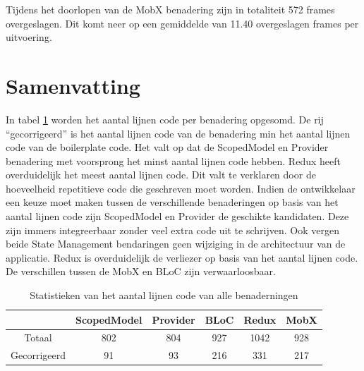 Tijdens het doorlopen van de MobX benadering zijn in totaliteit 572 frames overgeslagen. Dit komt neer op een gemiddelde van 11.40 overgeslagen frames per uitvoering.

\section{Samenvatting}
In tabel \ref{table:amount-lines-of-code} worden het aantal lijnen code per benadering opgesomd. De rij ``gecorrigeerd'' is het aantal lijnen code van de benadering min het aantal lijnen code van de boilerplate code. Het valt op dat de ScopedModel en Provider benadering met voorsprong het minst aantal lijnen code hebben. Redux heeft overduidelijk het meest aantal lijnen code. Dit valt te verklaren door de hoeveelheid repetitieve code die geschreven moet worden. \newline \newline
Indien de ontwikkelaar een keuze moet maken tussen de verschillende benaderingen op basis van het aantal lijnen code zijn ScopedModel en Provider de geschikte kandidaten. Deze zijn immers integreerbaar zonder veel extra code uit te schrijven. Ook vergen beide State Management bendaringen geen wijziging in de architectuur van de applicatie. \newline
Redux is overduidelijk de verliezer op basis van het aantal lijnen code. De verschillen tussen de MobX en BLoC zijn verwaarloosbaar.
\begin{table}[H]
    \centering
    \begin{tabular}{c|c|c|c|c|c}
        & \textbf{ScopedModel} & \textbf{Provider} & \textbf{BLoC} & \textbf{Redux} & \textbf{MobX} \\ \hline
        Totaal               & 802   &  804     &  927     &  1042    &  928        \\ \hline
        Gecorrigeerd         & 91    &  93      &  216     &  331     &  217
    \end{tabular}
    \caption{Statistieken van het aantal lijnen code van alle benaderningen}
    \label{table:amount-lines-of-code}
\end{table}

